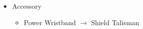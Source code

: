 \begin{menu}
\begin{multicols}{2}
\begin{itemize}
\begin{itemize}
        \begin{itemize}
            \item Accessory
            \begin{itemize}
                \item Power Wristband $\rightarrow$ Shield Talisman
            \end{itemize}
        \end{itemize}
    \end{itemize}
\end{itemize}
\end{multicols}
\end{menu}

\renewcommand{\first}{[1] }
\renewcommand{\second}{[2] Tireless Charge (\com/\med/\com)}
\renewcommand{\third}{[3] Hero's Charge (\syn/\med/\com)}
\renewcommand{\fourth}{[4] }
\renewcommand{\fifth}{[5] Bully (\syn/\sab/\com)}
\renewcommand{\sixth}{[6] Aggression (\com/\rav/\com)}
\newpage

